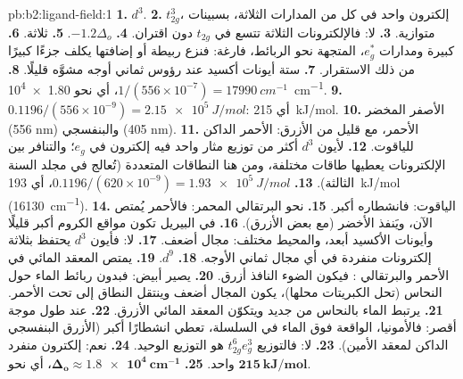 \begin{solution}{pb:b2:ligand-field:1}
\textbf{1.} $d^3$.
\textbf{2.} $t_{2g}^3$، إلكترون واحد في كل من المدارات الثلاثة، بسبينات متوازية.
\textbf{3.} لا: فالإلكترونات الثلاثة تتسع في $t_{2g}$ دون اقتران.
\textbf{4.} $-1.2\Delta_o$.
\textbf{5.} ثلاثة.
\textbf{6.}  كبيرة ومدارات $e_g^*$، المتجهة نحو الربائط،
فارغة: فنزع ربيطة أو إضافتها يكلف جزءًا كبيرًا من ذلك الاستقرار.
\textbf{7.} ستة أيونات أكسيد عند رؤوس ثماني أوجه مشوَّه قليلًا.
\textbf{8.} $1/(556 \times 10^{-7}) = \qty{17990}{cm^{-1}}$، أي نحو \qty{1.80e4}{cm^{-1}}.
\textbf{9.} $0.1196/(556 \times 10^{-9}) = \qty{2.15e5}{J/mol}$: أي \qty{215}{kJ/mol}.
\textbf{10.} الأصفر المخضر (556 nm) والبنفسجي (405 nm).
\textbf{11.} الأحمر، مع قليل من الأزرق: الأحمر الداكن للياقوت.
\textbf{12.} لأيون $d^3$ أكثر من توزيع مثار واحد فيه إلكترون في $e_g$؛
والتنافر بين الإلكترونات يعطيها طاقات مختلفة، ومن هنا النطاقات المتعددة (تُعالج في
مجلد السنة الثالثة).
\textbf{13.} $0.1196/(620 \times 10^{-9}) = \qty{1.93e5}{J/mol}$، أي \qty{193}{kJ/mol}
(\qty{16130}{cm^{-1}}).
\textbf{14.} الياقوت: فانشطاره أكبر.
\textbf{15.} نحو البرتقالي المحمر: فالأحمر يُمتص الآن، ويَنفذ الأخضر (مع بعض الأزرق).
\textbf{16.} في البيريل تكون مواقع الكروم أكبر قليلًا وأيونات الأكسيد أبعد،
والمحيط مختلف: مجال أضعف.
\textbf{17.} لا: فأيون $d^3$ يحتفظ بثلاثة إلكترونات منفردة في أي مجال ثماني الأوجه.
\textbf{18.} $d^9$.
\textbf{19.} يمتص المعقد المائي في الأحمر والبرتقالي : فيكون
الضوء النافذ أزرق.
\textbf{20.} يصير أبيض: فبدون ربائط الماء حول النحاس (تحل الكبريتات
محلها)، يكون المجال أضعف وينتقل النطاق إلى تحت الأحمر.
\textbf{21.} يرتبط الماء بالنحاس من جديد ويتكوّن المعقد المائي الأزرق.
\textbf{22.} عند طول موجة أقصر: فالأمونيا، الواقعة فوق الماء في السلسلة، تعطي
انشطارًا أكبر (الأزرق البنفسجي الداكن لمعقد الأمين).
\textbf{23.} لا: فالتوزيع $t_{2g}^6e_g^3$ هو التوزيع الوحيد.
\textbf{24.} نعم: إلكترون منفرد واحد.
\textbf{25.} $\boldsymbol{\Delta_o \approx \qty{1.8e4}{cm^{-1}}}$، أي نحو
$\boldsymbol{\qty{215}{kJ/mol}}$.
\end{solution}
